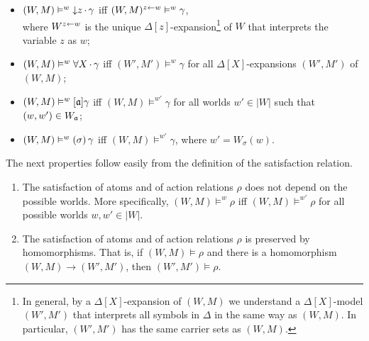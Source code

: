 \documentclass[a4paper,UKenglish,cleveref,autoref]{lipics-v2019}
\begin{document}
\begin{enumerate}
\begin{itemize}
  \item \((W, M) \vDash^{w} {\downarrow}z\,{\cdot}\,{\gamma}\) iff \((W, M)^{z \leftarrow w} \vDash^{w} \gamma\), \\
    where \(W^{z \leftarrow w}\) is the unique \(\Delta[z]\)-expansion\footnote{In general, by a \(\Delta[X]\)-expansion of \((W, M)\) we understand a \(\Delta[X]\)-model \((W', M')\) that interprets all symbols in \(\Delta\) in the same way as \((W, M)\). In particular, \((W', M')\) has the same carrier sets as \((W, M)\).} of \(W\) that interprets the variable \(z\) as \(w\);

  \item \((W, M) \vDash^{w} \forall X\,{\cdot}\,{\gamma}\) iff \((W', M') \models^{w} \gamma\) for all \(\Delta[X]\)-expansions \((W', M')\) of \((W, M)\);

  \item \((W, M) \vDash^{w} [\mathfrak{a}] \gamma\) iff \((W, M) \models^{w'}\gamma\) for all worlds \(w' \in |W|\) such that \((w, w') \in W_{\mathfrak{a}}\);

  \item \((W, M) \vDash^{w} (\sigma)\, \gamma\) iff \((W, M) \models^{w'}\gamma\), where \(w' = W_{\sigma}(w)\).

  \end{itemize}

\end{enumerate}

\begin{fact}
  \label{fact:sat-atoms-actrel}
  The next properties follow easily from the definition of the satisfaction relation.
  \begin{enumerate}
    
  \item The satisfaction of atoms and of action relations \(\rho\) does not depend on the possible worlds.
    More specifically, \((W, M) \models^{w} \rho\) iff \((W, M) \models^{w'} \rho\) for all possible worlds \(w, w' \in |W|\).

  \item The satisfaction of atoms and of action relations \(\rho\) is preserved by homomorphisms.
    That is, if \((W, M) \models \rho\) and there is a homomorphism \((W, M) \to (W', M')\), then \((W', M') \models \rho\).
    
  \end{enumerate}
\end{fact}
\end{document}
